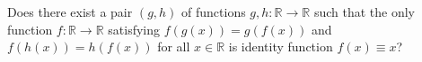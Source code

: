 Does there exist a pair $(g,h)$ of functions $g,h:\mathbb{R}\rightarrow\mathbb{R}$ such that the only function $f:\mathbb{R}\rightarrow\mathbb{R}$ satisfying $f(g(x))=g(f(x))$ and $f(h(x))=h(f(x))$ for all $x\in\mathbb{R}$ is identity function $f(x)\equiv x$?